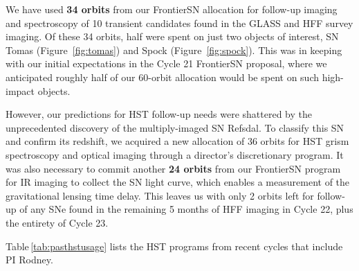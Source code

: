 \documentclass[12pt]{article}
\begin{document}
We have used {\bf 34 orbits} from our FrontierSN allocation for follow-up
imaging and spectroscopy of 10 transient candidates found in the GLASS
and HFF survey imaging.  Of these 34 orbits, half were spent on just
two objects of interest, SN Tomas (Figure~\ref{fig:tomas}) and Spock
(Figure~\ref{fig:spock}).  This was in keeping with our initial
expectations in the Cycle 21 FrontierSN proposal, where we anticipated
roughly half of our 60-orbit allocation would be spent on such
high-impact objects.

However, our predictions for HST follow-up needs were shattered by the
unprecedented discovery of the multiply-imaged SN Refsdal.  To
classify this SN and confirm its redshift, we acquired a new
allocation of 36 orbits for HST grism spectroscopy and optical imaging
through a director's discretionary program.  It was also necessary to
commit another {\bf 24 orbits} from our FrontierSN program for IR
imaging to collect the SN light curve, which enables a measurement of
the gravitational lensing time delay.  This leaves us with only 2
orbits left for follow-up of any SNe found in the remaining 5 months
of HFF imaging in Cycle 22, plus the entirety of Cycle 23.




%
%
%
\pasthstusage  %


Table\,\ref{tab:pasthstusage} lists the HST programs from recent cycles that include PI Rodney.
\end{document}
